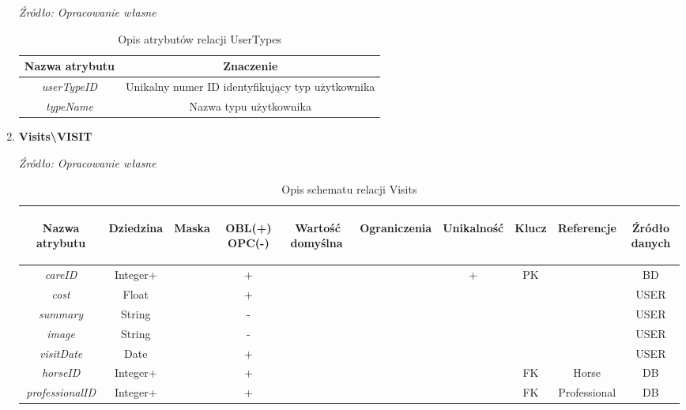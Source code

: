 \documentclass[12pt,twoside]{report}
\begin{document}
\begin{enumerate}[start=10,label={\bfseries REL\textbackslash\arabic*}]
	\begin{table}[H]
		\caption{Opis atrybutów relacji UserTypes}
		\textit{Źródło: Opracowanie własne}
		\label{UserTypesAttributeDescription}
		\centering
		\begin{tabular}{|c|c|}
			\hline
			Nazwa atrybutu & Znaczenie \\
			\hline
			\textit{userTypeID}&Unikalny numer ID identyfikujący typ użytkownika\\	
			\hline
			\textit{typeName}& Nazwa typu użytkownika\\	
			\hline	
		\end{tabular}
	\end{table}
	\item \textbf{Visits\textbackslash VISIT} 
	\begin{table}[H]
		\caption{Opis schematu relacji Visits}
		\textit{Źródło: Opracowanie własne}
		\label{VisitsRelationSchema}
		\centering
		\begin{tabular}{|c|c|c|c|c|c|c|c|c|c|}
			\hline
			\begin{sideways}Nazwa atrybutu\end{sideways}& 
			\begin{sideways}Dziedzina \end{sideways}& 
			\begin{sideways}Maska \end{sideways}& 
			\begin{sideways}OBL(+) OPC(-)\end{sideways} & 
			\begin{sideways}Wartość domyślna$\ $\end{sideways}& 
			\begin{sideways}Ograniczenia\end{sideways} &
			\begin{sideways}Unikalność \end{sideways}& 
			\begin{sideways}Klucz \end{sideways}& 
			\begin{sideways}Referencje \end{sideways}&
			\begin{sideways}Źródło danych\end{sideways}\\
			\hline
			\textit{careID}&Integer+&&+&&&+&PK&&BD\\	
			\hline
			\textit{cost}&Float&&+&&&&&&USER\\	
			\hline	
			\textit{summary}&String&&-&&&&&&USER\\	
			\hline	
			\textit{image}&String&&-&&&&&&USER\\	
			\hline	
			\textit{visitDate}&Date&&+&&&&&&USER\\	
			\hline			
			\textit{horseID}&Integer+&&+&&&&FK&Horse&DB\\	
			\hline			
			\textit{professionalID}&Integer+&&+&&&&FK&Professional&DB\\	
			\hline
		\end{tabular}
	\end{table}
	

\end{enumerate}
\end{document}
